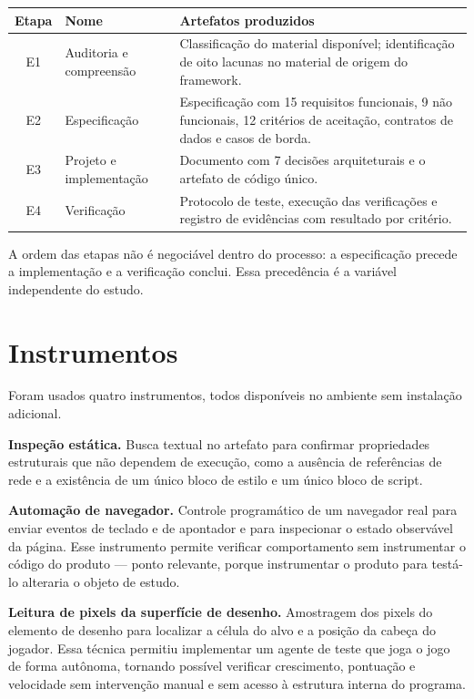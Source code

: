 \begin{quadro}[htb]
	\caption{Etapas do procedimento e artefatos produzidos}
	\label{qua:pipeline}
	\centering
	\footnotesize
	\begin{tabularx}{\textwidth}{@{}c p{2.6cm} X@{}}
		\toprule
		\textbf{Etapa} & \textbf{Nome} & \textbf{Artefatos produzidos} \\
		\midrule
		E1 & Auditoria e compreensão & Classificação do material disponível; identificação de oito lacunas no material de origem do framework. \\
		\addlinespace
		E2 & Especificação & Especificação com 15 requisitos funcionais, 9 não funcionais, 12 critérios de aceitação, contratos de dados e casos de borda. \\
		\addlinespace
		E3 & Projeto e implementação & Documento com 7 decisões arquiteturais e o artefato de código único. \\
		\addlinespace
		E4 & Verificação & Protocolo de teste, execução das verificações e registro de evidências com resultado por critério. \\
		\bottomrule
	\end{tabularx}
\end{quadro}

A ordem das etapas não é negociável dentro do processo: a especificação precede a
implementação e a verificação conclui. Essa precedência é a variável independente
do estudo.

\section{Instrumentos}
\label{sec:instrumentos}

Foram usados quatro instrumentos, todos disponíveis no ambiente sem instalação
adicional.

\textbf{Inspeção estática.} Busca textual no artefato para confirmar propriedades
estruturais que não dependem de execução, como a ausência de referências de rede
e a existência de um único bloco de estilo e um único bloco de script.

\textbf{Automação de navegador.} Controle programático de um navegador real para
enviar eventos de teclado e de apontador e para inspecionar o estado observável
da página. Esse instrumento permite verificar comportamento sem instrumentar o
código do produto --- ponto relevante, porque instrumentar o produto para
testá-lo alteraria o objeto de estudo.

\textbf{Leitura de pixels da superfície de desenho.} Amostragem dos pixels do
elemento de desenho para localizar a célula do alvo e a posição da cabeça do
jogador. Essa técnica permitiu implementar um agente de teste que joga o jogo de
forma autônoma, tornando possível verificar crescimento, pontuação e velocidade
sem intervenção manual e sem acesso à estrutura interna do programa.

